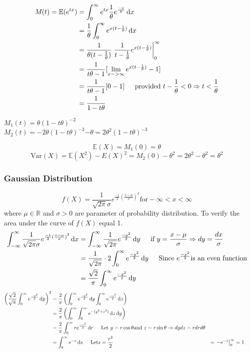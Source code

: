 \documentclass{article}
\newcommand{\R}{\mathbb{R}}
\newcommand{\E}{\mathbb{E}}
\newcommand{\mgf}[2]{M_{#1}(#2)}
\newcommand{\Var}{\mathrm{Var}}
\newcommand{\sqr}[1]{{#1}^2}
\newcommand{\uint}[4]{\int_{#1}^{#2} #3 \dd #4}
\newcommand{\dd}{\mathop{}\!\mathrm{d}}
\newcommand{\eval}[3]{\left. #1 \right|_{#2}^{#3}}
\begin{document}
\begin{align*}
    \mgf{}{t} = \E(e^{tx}) &= \uint{0}{\infty}{e^{tx}\frac{1}{\theta}e^{\frac{-x}{\theta}}}{x} \\
        &= \frac{1}{\theta}\uint{0}{\infty}{e^{x(t-\frac{1}{\theta})}}{x} \\
        &= \frac{1}{\theta(t - \frac{1}{\theta})} \eval{\frac{1}{t - \frac{1}{\theta}}e^{x(t- \frac{1}{\theta})}}{0}{\infty}\\
        &= \frac{1}{t\theta - 1} [\lim_{x-> \infty} e^{x(t - \frac{1}{\theta})} - 1]\\
        &= \frac{1}{t\theta - 1} [0 - 1] \indent \text{provided } t -\frac{1}{\theta} < 0 \Rightarrow t < \frac{1}{\theta} \\
        &= \frac{1}{1 - t\theta}
\end{align*}

\noindent $\mgf{1}{t} = \theta(1- t\theta)^{-2}$\\
$\mgf{2}{t} = -2\theta(1-t\theta)^{-3}{-\theta} = 2\sqr{\theta}(1-t\theta)^{-3}$

$$\E(X) = \mgf{1}{0} = \theta$$
$$\Var(X) =\E(\sqr{X}) - \sqr{E(X)} = \mgf{2}{0} - \sqr{\theta} = 2\sqr{\theta} - \sqr{\theta} = \sqr{\theta}$$

\subsubsection{Gaussian Distribution}
$$f(X) = \frac{1}{ \sqrt{2\pi}\sigma} e^{\frac{-1}{2}(\frac{x-\mu}{\sigma})^2} \text{for} -\infty < x < \infty$$
where $\mu \in \R$ and $\sigma > 0$ are parameter of probability distribution.
To verify the area under the curve of $f(X)$ equal 1.
\begin{align*}
    \uint{-\infty}{\infty}{\frac{1}{\sqrt{2\pi}\sigma}e^{\frac{-1}{2}\sqr{(\frac{x-\mu}{\sigma})}}}{x} &= \uint{-\infty}{\infty}{\frac{1}{\sqrt{2\pi}}e^{\frac{-\sqr{y}}{2}}}{y} \indent \text{if } y = \frac{x - \mu}{\sigma} \Rightarrow dy = \frac{dx}{\sigma} \\
    &= \frac{1}{\sqrt{2\pi}} \cdot 2 \uint{0}{\infty}{e^{\frac{-y^2}{2}}}{y} \indent \text{Since } e^{\frac{-y^2}{2}} \text{is an even function}\\
    &= \frac{\sqrt{2}}{\pi}\uint{0}{\infty}{e^{\frac{-\sqr{y}}{2}}}{y}
\end{align*}
\begin{align*}
    \sqr{\left(\frac{\sqrt{2}}{\sqrt{\pi}}\uint{0}{\infty}{e^{\frac{-\sqr{y}}{2}}}{y}\right)} &= \frac{2}{\pi}\left(\uint{0}{\infty}{e^{\frac{-\sqr{y}}{2}}}{y} \uint{0}{\infty}{e^{\frac{-\sqr{z}}{2}}}{z}\right) \\
    &= \frac{2}{\pi}\left(\uint{0}{\infty}{\uint{0}{\infty}{e^{-(\sqr{y} + \sqr{z})}}{z}}{y}\right)\\
    &= \frac{2}{\pi} \uint{0}{\infty}{re^{\frac{-\sqr{r}}{2}}}{r} \indent \text{Let } y = r\cos\theta \text{and } z = r\sin\theta \Rightarrow dydz = rdrd\theta \\
    &= \uint{0}{\infty}{e^{-s}}{s}  \indent \text{Let} s = \frac{\sqr{r}}{2}
    &= \eval{-e^{-s}}{0}{\infty}
    &= 1
\end{align*}
\end{document}
